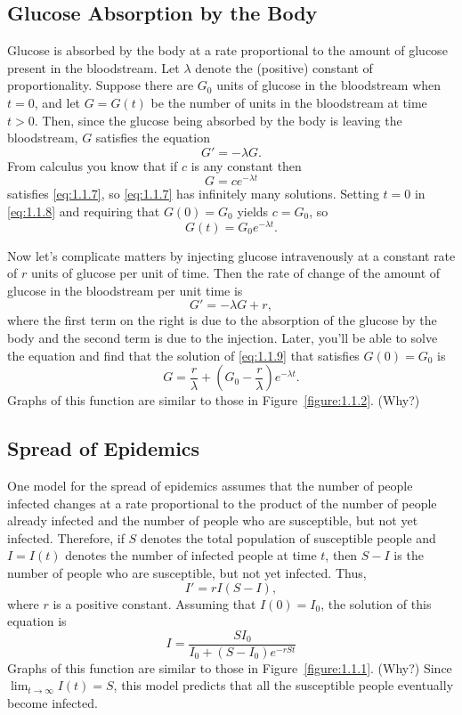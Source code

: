 \documentclass{ximera}
\begin{document}
\subsection*{Glucose Absorption by the Body}

Glucose is absorbed by
the body at a rate proportional to the amount of glucose present in
the bloodstream. Let $\lambda$ denote the (positive) constant of
proportionality. Suppose   there are $G_0$ units of glucose in
the bloodstream when $t=0$, and let $G=G(t)$ be the number of units in
the bloodstream at time $t>0$. Then, since the glucose being absorbed
by the body is leaving the bloodstream, $G$ satisfies the equation
\begin{equation} \label{eq:1.1.7}
G'=-\lambda G.
\end{equation}
From  calculus you know that if $c$ is any constant then
\begin{equation} \label{eq:1.1.8}
G=ce^{-\lambda t}
\end{equation}
satisfies \eqref{eq:1.1.7}, so \eqref{eq:1.1.7} has infinitely
many solutions.
 Setting $t=0$ in \eqref{eq:1.1.8} and requiring that
$G(0)=G_0$ yields $c=G_0$, so
$$
G(t)=G_0e^{-\lambda t}.
$$

Now let's complicate matters by injecting glucose intravenously
at a constant rate of $r$ units of glucose per unit of time.
Then the rate of change of the amount of glucose  in the bloodstream
per unit time is
\begin{equation} \label{eq:1.1.9}
G'=-\lambda G+r,
\end{equation}
where the first term on the right is due to the absorption of the
glucose by the body and the second term is due to the injection.
 Later,
you'll be able to solve the equation and find %
that the solution
of
\eqref{eq:1.1.9} that satisfies $G(0)=G_0$ is
$$
G=\frac{r}{\lambda}+\left(G_0-\frac{r}{\lambda}\right)e^{-\lambda t}.
$$
Graphs of  this function are similar to those in
Figure~\ref{figure:1.1.2}.
(Why?)



\subsection*{Spread of Epidemics}

One model for the spread of epidemics assumes that the number of
people infected changes at a rate proportional to the product of the
number of people already infected and the number of people who are
susceptible, but not yet infected. Therefore, if $S$ denotes the
total population of susceptible people and $I=I(t)$ denotes the
number
of infected people at time $t$, then $S-I$ is the number of people
who are susceptible, but not yet infected. Thus,
$$
I'=rI(S-I),
$$
where $r$ is a positive constant. Assuming that $I(0)=I_0$,
the solution of this equation is
$$
I=\frac{SI_0}{I_0+(S-I_0)e^{-rSt}}
$$
 Graphs of this function are similar to those in
Figure~\ref{figure:1.1.1}.
(Why?)
Since $\lim_{t\to\infty}I(t)=S$, this model predicts that all the
susceptible people eventually become infected.
\end{document}
